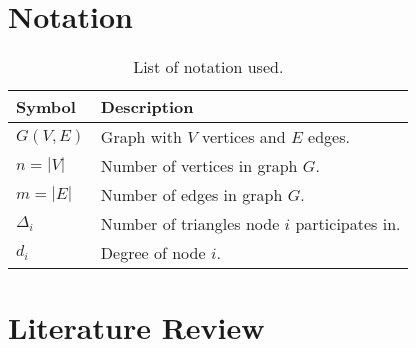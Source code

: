 \documentclass[12pt]{article}
\begin{document}
\section{Notation}

\begin{table}[ht]
    \centering
    \begin{tabular}{ll}
        \toprule
        \textbf{Symbol} & \textbf{Description} \\
        \midrule
        $G(V, E)$       & Graph with $V$ vertices and $E$ edges. \\
        $n = |V|$       & Number of vertices in graph $G$. \\
        $m = |E|$       & Number of edges in graph $G$. \\
        $\Delta_i$      & Number of triangles node $i$ participates in. \\
        $d_i$           & Degree of node $i$. \\
        \bottomrule
    \end{tabular}
    \caption{List of notation used.}
    \label{tab:notation}
\end{table}

\newpage

\section{Literature Review}
\end{document}
